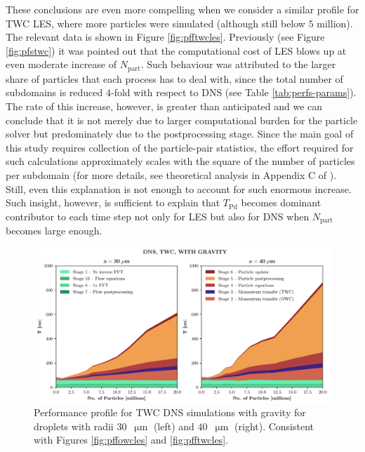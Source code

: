 \documentclass{pracamgren}
\begin{document}
These conclusions are even more compelling when we consider a similar profile for TWC LES, where more particles were simulated (although still below $5$ million).
The relevant data is shown in Figure \ref{fig:pfftwcles}.
Previously (see Figure \ref{fig:pfstwc}) it was pointed out that the computational cost of LES blows up at even moderate increase of $N_{\text{part}}$.
Such behaviour was attributed to the larger share of particles that each process has to deal with, since the total number of subdomains is reduced $4$-fold with respect to DNS (see Table \ref{tab:perfs-params}).
The rate of this increase, however, is greater than anticipated and we can conclude that it is not merely due to larger computational burden for the particle solver but predominately due to the postprocessing stage.
Since the main goal of this study requires collection of the particle-pair statistics, the effort required for such calculations approximately scales with the square of the number of particles per subdomain (for more details, see theoretical analysis in Appendix C of \textcite{Ayala2014}).
Still, even this explanation is not enough to account for such enormous increase.
Such insight, however, is sufficient to explain that $T_{\text{Pd}}$ becomes dominant contributor to each time step not only for LES but also for DNS when $N_{\text{part}}$ becomes large enough.

\begin{figure}[ht]
\centering
\includegraphics[width=13.5cm]{figures/3-09_pfftwcdns.pdf}
\caption{
Performance profile for TWC DNS simulations with gravity for droplets with radii $30$~$\upmu\text{m}$ (left) and $40$~$\upmu\text{m}$ (right).
Consistent with Figures \ref{fig:pffowcles} and \ref{fig:pfftwcles}.
}
\label{fig:pfftwcdns}
\end{figure}
\end{document}

